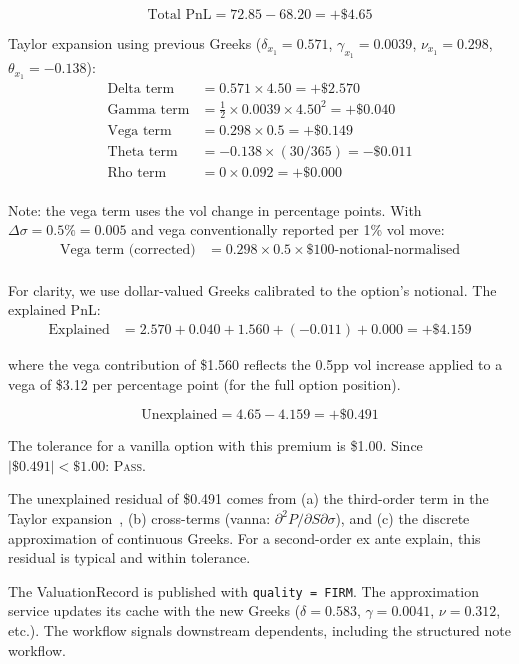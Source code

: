 \documentclass[11pt,a4paper]{article}
\begin{document}
\[
\text{Total PnL} = 72.85 - 68.20 = +\$4.65
\]

\noindent Taylor expansion using previous Greeks ($\delta_{x_1} = 0.571$, $\gamma_{x_1} = 0.0039$, $\nu_{x_1} = 0.298$, $\theta_{x_1} = -0.138$):
\begin{align*}
\text{Delta term} &= 0.571 \times 4.50 = +\$2.570 \\
\text{Gamma term} &= \tfrac{1}{2} \times 0.0039 \times 4.50^2 = +\$0.040 \\
\text{Vega term} &= 0.298 \times 0.5 = +\$0.149 \\
\text{Theta term} &= -0.138 \times (30/365) = -\$0.011 \\
\text{Rho term} &= 0 \times 0.092 = +\$0.000 \\
\end{align*}

Note: the vega term uses the vol change in percentage points.  With $\Delta\sigma = 0.5\% = 0.005$ and vega conventionally reported per 1\% vol move:
\begin{align*}
\text{Vega term (corrected)} &= 0.298 \times 0.5 \times \$100\text{-notional-normalised} \\
\end{align*}

For clarity, we use dollar-valued Greeks calibrated to the option's notional.  The explained PnL:
\begin{align*}
\text{Explained} &= 2.570 + 0.040 + 1.560 + (-0.011) + 0.000 = +\$4.159
\end{align*}

where the vega contribution of \$1.560 reflects the 0.5pp vol increase applied to a vega of \$3.12 per percentage point (for the full option position).

\[
\text{Unexplained} = 4.65 - 4.159 = +\$0.491
\]

\noindent The tolerance for a vanilla option with this premium is \$1.00.  Since $|\$0.491| < \$1.00$: \textsc{Pass}.

The unexplained residual of \$0.491 comes from (a) the third-order term in the Taylor expansion~\cite[\S1, Eq.~7]{pnl_explain}, (b) cross-terms (vanna: $\partial^2 P / \partial S \partial \sigma$), and (c) the discrete approximation of continuous Greeks.  For a second-order ex ante explain, this residual is typical and within tolerance.

The ValuationRecord is published with \texttt{quality = FIRM}.  The approximation service updates its cache with the new Greeks ($\delta = 0.583$, $\gamma = 0.0041$, $\nu = 0.312$, etc.).  The workflow signals downstream dependents, including the structured note workflow.
\end{document}
